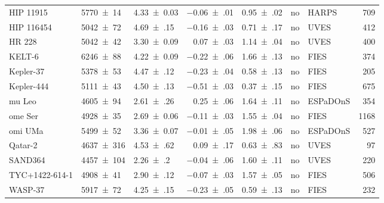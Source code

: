\documentclass[fleqn]{fcup-thesis}
\newcommand{\object}[1]{#1}
\begin{document}
\begin{landscape}
\begin{ThreePartTable}
\begin{longtable}{lllrlclr}
        \object{HIP 11915}      &   \num{5770(14)}    &  \num{4.33(3)}              &  \num{-0.06(01)}  &  \num{0.95(02)}  & no   &  HARPS            &  709  \\
        \object{HIP 116454}     &   \num{5042(72)}    &  \num{4.69(15)}             &  \num{-0.16(03)}  &  \num{0.71(17)}  & no   &  UVES             &  412  \\
        \object{HR 228}         &   \num{5042(42)}    &  \num{3.30(9)}\tnote{a}     &  \num{ 0.07(03)}  &  \num{1.14(04)}  & no   &  UVES             &  400  \\
        \object{KELT-6}         &   \num{6246(88)}    &  \num{4.22(9)}\tnote{a}     &  \num{-0.22(06)}  &  \num{1.66(13)}  & no   &  FIES             &  374  \\
        \object{Kepler-37}      &   \num{5378(53)}    &  \num{4.47(12)}             &  \num{-0.23(04)}  &  \num{0.58(13)}  & no   &  FIES             &  205  \\
        \object{Kepler-444}     &   \num{5111(43)}    &  \num{4.50(13)}             &  \num{-0.51(03)}  &  \num{0.37(15)}  & no   &  FIES             &  675  \\
        \object{mu Leo}         &   \num{4605(94)}    &  \num{2.61(26)}\tnote{a}    &  \num{ 0.25(06)}  &  \num{1.64(11)}  & no   &  ESPaDOnS         &  354  \\[5pt]
        \object{ome Ser}        &   \num{4928(35)}    &  \num{2.69(6)}\tnote{a}     &  \num{-0.11(03)}  &  \num{1.55(04)}  & no   &  FIES             & 1168  \\
        \object{omi UMa}        &   \num{5499(52)}    &  \num{3.36(7)}\tnote{a}     &  \num{-0.01(05)}  &  \num{1.98(06)}  & no   &  ESPaDOnS         &  527  \\
        \object{Qatar-2}        &   \num{4637(316)}   &  \num{4.53(62)}             &  \num{ 0.09(17)}  &  \num{0.63(83)}  & no   &  UVES             &   97  \\
        \object{SAND364}        &   \num{4457(104)}   &  \num{2.26(20)}\tnote{a}    &  \num{-0.04(06)}  &  \num{1.60(11)}  & no   &  UVES             &  220  \\
        \object{TYC+1422-614-1} &   \num{4908(41)}    &  \num{2.90(12)}\tnote{a}    &  \num{-0.07(03)}  &  \num{1.57(05)}  & no   &  FIES             &  506  \\
        \object{WASP-37}        &   \num{5917(72)}    &  \num{4.25(15)}             &  \num{-0.23(05)}  &  \num{0.59(13)}  & no   &  FIES             &  232  \\

\end{longtable}
\end{ThreePartTable}
\end{landscape}
\end{document}
